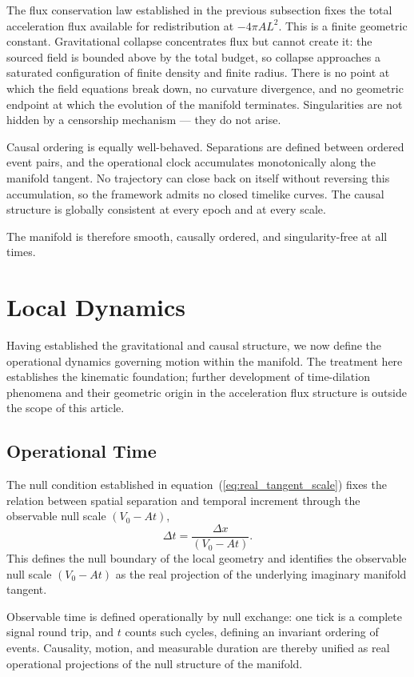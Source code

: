 \documentclass[fontsize=12pt, paper=a4]{scrartcl}
\begin{document}
The flux conservation law established in the previous subsection fixes the total acceleration flux available for redistribution at $-4\pi AL^2$. This is a finite geometric constant. Gravitational collapse concentrates flux but cannot create it: the sourced field is bounded above by the total budget, so collapse approaches a saturated configuration of finite density and finite radius. There is no point at which the field equations break down, no curvature divergence, and no geometric endpoint at which the evolution of the manifold terminates. Singularities are not hidden by a censorship mechanism — they do not arise.

Causal ordering is equally well-behaved. Separations are defined between ordered event pairs, and the operational clock accumulates monotonically along the manifold tangent. No trajectory can close back on itself without reversing this accumulation, so the framework admits no closed timelike curves. The causal structure is globally consistent at every epoch and at every scale.

The manifold is therefore smooth, causally ordered, and singularity-free at all times.

\section{Local Dynamics}
Having established the gravitational and causal structure, we now define the operational dynamics governing motion within the manifold. The treatment here establishes the kinematic foundation; further development of time-dilation phenomena and their geometric origin in the acceleration flux structure is outside the scope of this article.

\subsection{Operational Time}

The null condition established in equation~(\ref{eq:real_tangent_scale}) fixes the relation between spatial separation and temporal increment through the observable null scale $(V_0 - At)$,
\begin{equation}
\Delta t=\frac{\Delta x}{(V_0 - At)}.
\label{eq:operational_time}
\end{equation}
This defines the null boundary of the local geometry and identifies the observable null scale $(V_0-At)$ as the real projection of the underlying imaginary manifold tangent.

Observable time is defined operationally by null exchange: one tick is a complete signal round trip, and $t$ counts such cycles, defining an invariant ordering of events. Causality, motion, and measurable duration are thereby unified as real operational projections of the null structure of the manifold.
\end{document}

